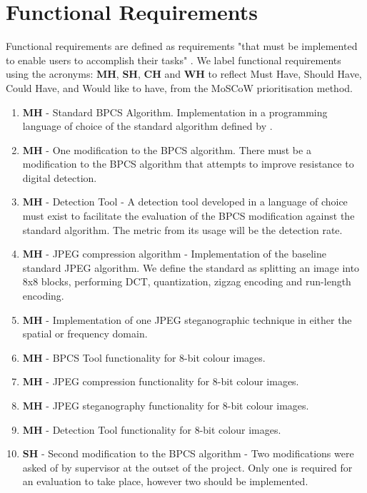 \documentclass{l4proj}
\begin{document}
\section{Functional Requirements}\label{functional_requirements}

Functional requirements are defined as requirements "that must be implemented to enable users to accomplish their tasks" \citep{functional_non_functional}. We label functional requirements using the acronyms: \textbf{MH}, \textbf{SH}, \textbf{CH} and \textbf{WH} to reflect Must Have, Should Have, Could Have, and Would like to have, from the MoSCoW prioritisation method.

\begin{enumerate}
    \item \textbf{MH} - Standard BPCS Algorithm. Implementation in a programming language of choice of the standard algorithm defined by \citet{Kawaguchi1999PrinciplesAA}.
    \item \textbf{MH} - One modification to the BPCS algorithm. There must be a modification to the BPCS algorithm that attempts to improve resistance to digital detection.
    \item \textbf{MH} - Detection Tool - A detection tool developed in a language of choice must exist to facilitate the evaluation of the BPCS modification against the standard algorithm. The metric from its usage will be the detection rate. 
    \item \textbf{MH} - JPEG compression algorithm - Implementation of the baseline standard JPEG algorithm. We define the standard as splitting an image into 8x8 blocks, performing DCT, quantization, zigzag encoding and run-length encoding.    
    \item \textbf{MH} - Implementation of one JPEG steganographic technique in either the spatial or frequency domain. 
    \item \textbf{MH} - BPCS Tool functionality for 8-bit colour images.
    \item \textbf{MH} - JPEG compression functionality for 8-bit colour images.
    \item \textbf{MH} - JPEG steganography functionality for 8-bit colour images.
    \item \textbf{MH} - Detection Tool functionality for 8-bit colour images.
    \item \textbf{SH} - Second modification to the BPCS algorithm - Two modifications were asked of by supervisor at the outset of the project. Only one is required for an evaluation to take place, however two should be implemented. 

\end{enumerate}
\end{document}
